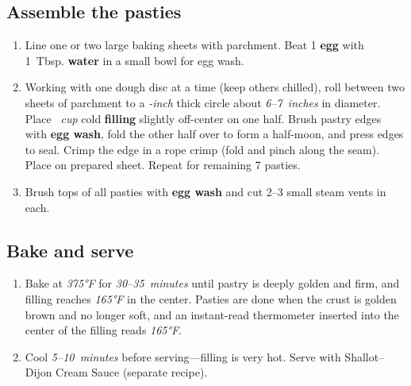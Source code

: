 \documentclass[11pt,letterpaper]{article}
\begin{document}
\subsection*{Assemble the pasties}
\begin{enumerate}
    \item Line one or two large baking sheets with parchment. Beat 1 \textbf{egg} with 1~Tbsp. \textbf{water} in a small bowl for egg wash.
    \item Working with one dough disc at a time (keep others chilled), roll between two sheets of parchment to a \textit{-inch} thick circle about \textit{6--7~inches} in diameter. Place \textit{~cup} cold \textbf{filling} slightly off-center on one half. Brush pastry edges with \textbf{egg wash}, fold the other half over to form a half-moon, and press edges to seal. Crimp the edge in a rope crimp (fold and pinch along the seam). Place on prepared sheet. Repeat for remaining 7 pasties.
    \item Brush tops of all pasties with \textbf{egg wash} and cut 2--3 small steam vents in each.
\end{enumerate}

\subsection*{Bake and serve}
\begin{enumerate}
    \item Bake at \textit{375°F} for \textit{30--35~minutes} until pastry is deeply golden and firm, and filling reaches \textit{165°F} in the center. Pasties are done when the crust is golden brown and no longer soft, and an instant-read thermometer inserted into the center of the filling reads \textit{165°F}.
    \item Cool \textit{5--10~minutes} before serving---filling is very hot. Serve with Shallot--Dijon Cream Sauce (separate recipe).
\end{enumerate}

\newpage
\end{document}
